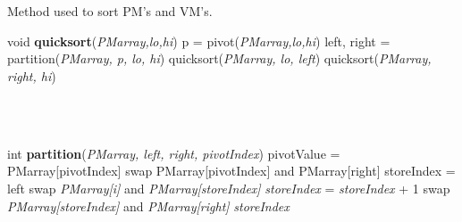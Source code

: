 ﻿\documentclass[a4paper,11pt]{article}
\begin{document}
\mbox{}\\\\
Method used to sort PM's and VM's.
\begin{algorithmic}[1]
\STATE void \textbf{quicksort}(\emph{PMarray,lo,hi})
\STATE p = pivot(\emph{PMarray,lo,hi})
\STATE left, right = partition(\emph{PMarray, p, lo, hi})
\STATE quicksort(\emph{PMarray, lo, left})
\STATE quicksort(\emph{PMarray, right, hi})
\ENDIF
\end{algorithmic}
\mbox{}\\\\
\begin{algorithmic}[1]
\STATE int \textbf{partition}(\emph{PMarray, left, right, pivotIndex})
\STATE pivotValue = PMarray[pivotIndex]
\STATE swap PMarray[pivotIndex] and PMarray[right]
\STATE storeIndex = left
\STATE swap \emph{PMarray[i]} and \emph{PMarray[storeIndex]}
\STATE \emph{storeIndex} = \emph{storeIndex} + 1
\ENDIF
\STATE swap \emph{PMarray[storeIndex]} and \emph{PMarray[right]}
\ENDFOR
\RETURN \emph{storeIndex}
\end{algorithmic}
\end{document}
